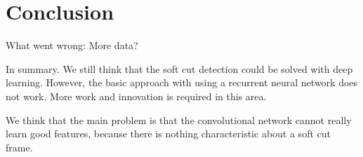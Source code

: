 \section{Conclusion}
\label{sec:conclusion}

What went wrong:
More data?

In summary.
We still think that the soft cut detection could be solved with deep learning.
However, the basic approach with using a recurrent neural network does not work.
More work and innovation is required in this area.

We think that the main problem is that the convolutional network cannot really learn good features, because there is nothing characteristic about a soft cut frame.

